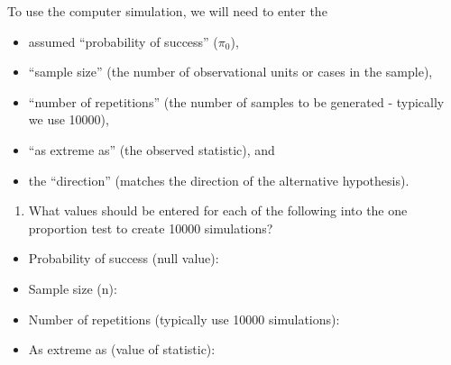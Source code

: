 \documentclass[
]{report}
\providecommand{\tightlist}{%
  \setlength{\itemsep}{0pt}\setlength{\parskip}{0pt}}
\begin{document}
\newpage

To use the computer simulation, we will need to enter the

\begin{itemize}
\tightlist
\item
  assumed ``probability of success'' (\(\pi_0\)),
\item
  ``sample size'' (the number of observational units or cases in the sample),
\item
  ``number of repetitions'' (the number of samples to be generated - typically we use 10000),
\item
  ``as extreme as'' (the observed statistic), and
\item
  the ``direction'' (matches the direction of the alternative hypothesis).
\end{itemize}

\begin{enumerate}
\def\labelenumi{\arabic{enumi}.}
\tightlist
\item
  What values should be entered for each of the following into the one proportion test to create 10000 simulations?
\end{enumerate}

\vspace{1mm}

\begin{itemize}
\tightlist
\item
  Probability of success (null value):
\end{itemize}

\vspace{.2in}

\begin{itemize}
\tightlist
\item
  Sample size (n):
\end{itemize}

\vspace{.2in}

\begin{itemize}
\tightlist
\item
  Number of repetitions (typically use 10000 simulations):
\end{itemize}

\vspace{.2in}

\begin{itemize}
\tightlist
\item
  As extreme as (value of statistic):
\end{itemize}
\end{document}
